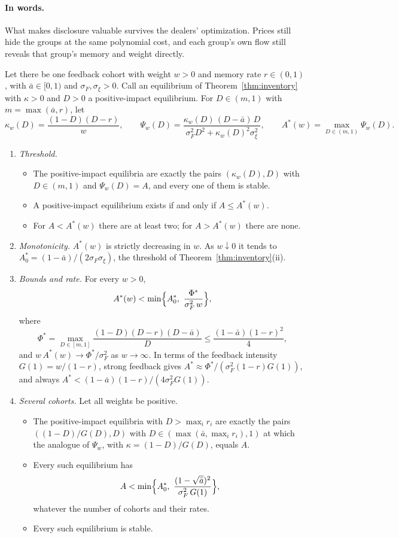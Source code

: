 \paragraph{In words.} What makes disclosure valuable survives the dealers' optimization. Prices still hide the groups at the same polynomial cost, and each group's own flow still reveals that group's memory and weight directly.

\begin{theorem}\label{thm:fragility}
Let there be one feedback cohort with weight $w>0$ and memory rate $r\in(0,1)$, with $\bar a\in[0,1)$ and $\sigma_F,\sigma_\xi>0$. Call an equilibrium of Theorem~\ref{thm:inventory} with $\kappa>0$ and $D>0$ a positive-impact equilibrium. For $D\in(m,1)$ with $m=\max(\bar a,r)$, let
\[
 \kappa_w(D)=\frac{(1-D)(D-r)}{w},\qquad \Psi_w(D)=\frac{\kappa_w(D)\,(D-\bar a)\,D}{\sigma_F^2D^2+\kappa_w(D)^2\sigma_\xi^2},\qquad A^*(w)=\max_{D\in(m,1)}\Psi_w(D).
\]
\begin{enumerate}[label=(\roman*),itemsep=1pt]
\item \emph{Threshold.}
 \begin{itemize}[itemsep=1pt,topsep=2pt]
 \item The positive-impact equilibria are exactly the pairs $(\kappa_w(D),D)$ with $D\in(m,1)$ and $\Psi_w(D)=A$, and every one of them is stable.
 \item A positive-impact equilibrium exists if and only if $A\le A^*(w)$.
 \item For $A<A^*(w)$ there are at least two; for $A>A^*(w)$ there are none.
 \end{itemize}
\item \emph{Monotonicity.} $A^*(w)$ is strictly decreasing in $w$. As $w\downarrow0$ it tends to $A^*_0=(1-\bar a)/(2\sigma_F\sigma_\xi)$, the threshold of Theorem~\ref{thm:inventory}(ii).
\item \emph{Bounds and rate.} For every $w>0$,
\[
 A^*(w)<\min\Bigl\{A^*_0,\ \frac{\Phi^*}{\sigma_F^2\,w}\Bigr\},
\]
 where
\[
 \Phi^*=\max_{D\in[m,1]}\frac{(1-D)(D-r)(D-\bar a)}{D}\le\frac{(1-\bar a)(1-r)^2}{4},
\]
 and $w\,A^*(w)\to\Phi^*/\sigma_F^2$ as $w\to\infty$. In terms of the feedback intensity $G(1)=w/(1-r)$, strong feedback gives $A^*\approx\Phi^*/(\sigma_F^2(1-r)G(1))$, and always $A^*<(1-\bar a)(1-r)/(4\sigma_F^2G(1))$.
\item \emph{Several cohorts.} Let all weights be positive.
 \begin{itemize}[itemsep=1pt,topsep=2pt]
 \item The positive-impact equilibria with $D>\max_ir_i$ are exactly the pairs $((1-D)/G(D),D)$ with $D\in(\max(\bar a,\max_ir_i),1)$ at which the analogue of $\Psi_w$, with $\kappa=(1-D)/G(D)$, equals $A$.
 \item Every such equilibrium has
 \[
  A<\min\Bigl\{A^*_0,\ \frac{(1-\sqrt{\bar a})^2}{\sigma_F^2\,G(1)}\Bigr\},
 \]
 whatever the number of cohorts and their rates.
 \item Every such equilibrium is stable.
 \end{itemize}
\end{enumerate}
\end{theorem}

